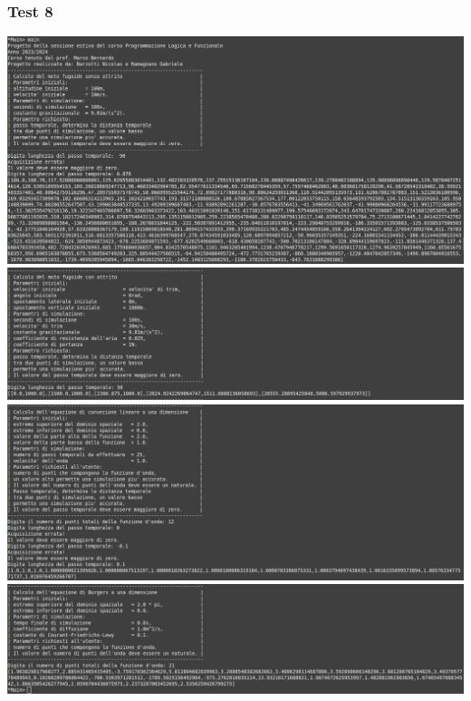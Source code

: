 \subsubsection*{Test 8}
\includegraphics[width=\textwidth,height=\textheight,keepaspectratio]{05_testing/image/hs/08_test/01_misto.png}
\\
\includegraphics[width=\textwidth,height=\textheight,keepaspectratio]{05_testing/image/hs/08_test/02_misto.png}
\\
\includegraphics[width=\textwidth,height=\textheight,keepaspectratio]{05_testing/image/hs/08_test/03_misto.png}
\\
\includegraphics[width=\textwidth,height=\textheight,keepaspectratio]{05_testing/image/hs/08_test/04_misto.png}


